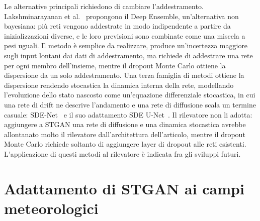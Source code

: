 Le alternative principali richiedono di cambiare l'addestramento. Lakshminarayanan et al.~\cite{lakshminarayanan2017ensembles} propongono il Deep Ensemble, un'alternativa non bayesiana: più reti vengono addestrate in modo indipendente a partire da inizializzazioni diverse, e le loro previsioni sono combinate come una miscela a pesi uguali. Il metodo è semplice da realizzare, produce un'incertezza maggiore sugli input lontani dai dati di addestramento, ma richiede di addestrare una rete per ogni membro dell'insieme, mentre il dropout Monte Carlo ottiene la dispersione da un solo addestramento. Una terza famiglia di metodi ottiene la dispersione rendendo stocastica la dinamica interna della rete, modellando l'evoluzione dello stato nascosto come un'equazione differenziale stocastica, in cui una rete di drift ne descrive l'andamento e una rete di diffusione scala un termine casuale: SDE-Net~\cite{kong2020sdenet} e il suo adattamento SDE U-Net~\cite{monaco2025sdeunet}. Il rilevatore non li adotta: aggiungere a STGAN una rete di diffusione e una dinamica stocastica avrebbe allontanato molto il rilevatore dall'architettura dell'articolo, mentre il dropout Monte Carlo richiede soltanto di aggiungere layer di dropout alle reti esistenti. L'applicazione di questi metodi al rilevatore è indicata fra gli sviluppi futuri.

\section{Adattamento di STGAN ai campi meteorologici}
\label{sec:rw-da-stgan}

